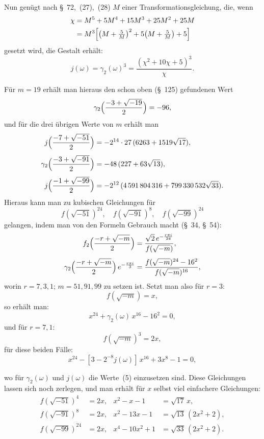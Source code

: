 \documentclass[12pt,a4paper]{article}
\theoremstyle{definition}
\begin{document}
Nun genügt nach \S~72,~(27),~(28) $M$ einer Transformationsgleichung, die, wenn
\begin{align*}
\chi &= M^{5} + 5M^{4} + 15M^{3} + 25M^{2} + 25M\\
&= M^{3}\Bigl[\bigl(M + \tfrac{5}{M}\bigr)^{2} + 5\bigl(M + \tfrac{5}{M}\bigr) + 5\Bigr]
\end{align*}
gesetzt wird, die Gestalt erhält:
\begin{equation}
j(\omega) = \gamma_{2}(\omega)^{3} = \frac{(\chi^{2} + 10\chi + 5)^{3}}{\chi}.
\end{equation}

Für $m = 19$ erhält man hieraus den schon oben (\S~125) gefundenen Wert
\[
\gamma_{2}\Bigl(\frac{-3 + \sqrt{-19}}{2}\Bigr) = -96,
\]
und für die drei übrigen Werte von $m$ erhält man
\begin{align}
j\Bigl(\frac{-7 + \sqrt{-51}}{2}\Bigr) &= -2^{14} \cdot 27\,(6263 + 1519\sqrt{17}),\notag\\[4pt]
\gamma_{2}\Bigl(\frac{-3 + \sqrt{-91}}{2}\Bigr) &= -48\,(227 + 63\sqrt{13}),\notag\\[4pt]
j\Bigl(\frac{-1 + \sqrt{-99}}{2}\Bigr) &= -2^{12}\,(4\,591\,804\,316 + 799\,330\,532\sqrt{33}).
\end{align}
Hieraus kann man zu kubischen Gleichungen für
\[
f(\sqrt{-51})^{24},\quad f(\sqrt{-91})^{8},\quad f(\sqrt{-99})^{24}
\]
gelangen, indem man von den Formeln Gebrauch macht (\S~34, \S~54):
\begin{align*}
f_{2}\Bigl(\frac{-r + \sqrt{-m}}{2}\Bigr) &= 
\frac{\sqrt{2}\,e^{-\frac{r\pi i}{24}}}{f(\sqrt{-m})},\\[4pt]
\gamma_{2}\Bigl(\frac{-r + \sqrt{-m}}{2}\Bigr)\,e^{-\frac{r\pi i}{3}} &=
\frac{f(\sqrt{-m})^{24} - 16^{2}}{f(\sqrt{-m})^{16}},
\end{align*}
worin $r = 7, 3, 1$; $m = 51, 91, 99$ zu setzen ist. Setzt man also für $r = 3$:
\[
f(\sqrt{-m}) = x,
\]
so erhält man:
\begin{equation}
x^{24} + \gamma_{2}(\omega)\,x^{16} - 16^{2} = 0,
\end{equation}
und für $r = 7, 1$:
\[
f(\sqrt{-m})^{3} = 2x,
\]
für diese beiden Fälle:
\begin{equation}
x^{24} - [3 - 2^{-8}j(\omega)]\,x^{16} + 3x^{8} - 1 = 0,
\end{equation}

\noindent
wo für $\gamma_{2}(\omega)$ und $j(\omega)$ die Werte~(5) einzusetzen sind. Diese 
Gleichungen lassen sich noch zerlegen, und man erhält für $x$ selbst viel 
einfachere Gleichungen:
\begin{align*}
f(\sqrt{-51})^{4} &= 2x, & x^{2} - x - 1 &= \sqrt{17}\,x,\\[4pt]
f(\sqrt{-91})^{8} &= 2x, & x^{2} - 13x - 1 &= \sqrt{13}\,(2x^{2} + 2),\\[4pt]
f(\sqrt{-99})^{24} &= 2x, & x^{4} - 10x^{2} + 1 &= \sqrt{33}\,(2x^{2} + 2).
\end{align*}
\end{document}
